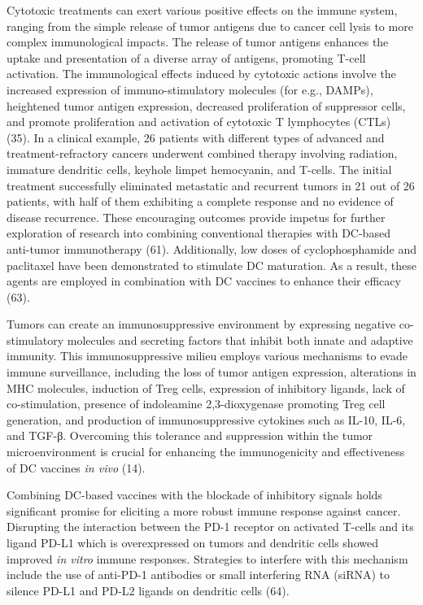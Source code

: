 \documentclass[
]{article}
\begin{document}
Cytotoxic treatments can exert various positive effects on the immune
system, ranging from the simple release of tumor antigens due to cancer
cell lysis to more complex immunological impacts. The release of tumor
antigens enhances the uptake and presentation of a diverse array of
antigens, promoting T-cell activation. The immunological effects induced
by cytotoxic actions involve the increased expression of
immuno-stimulatory molecules (for e.g., DAMPs), heightened tumor antigen
expression, decreased proliferation of suppressor cells, and promote
proliferation and activation of cytotoxic T lymphocytes (CTLs) (35). In
a clinical example, 26 patients with different types of advanced and
treatment-refractory cancers underwent combined therapy involving
radiation, immature dendritic cells, keyhole limpet hemocyanin, and
T-cells. The initial treatment successfully eliminated metastatic and
recurrent tumors in 21 out of 26 patients, with half of them exhibiting
a complete response and no evidence of disease recurrence. These
encouraging outcomes provide impetus for further exploration of research
into combining conventional therapies with DC-based anti-tumor
immunotherapy (61). Additionally, low doses of cyclophosphamide and
paclitaxel have been demonstrated to stimulate DC maturation. As a
result, these agents are employed in combination with DC vaccines to
enhance their efficacy (63).

Tumors can create an immunosuppressive environment by expressing
negative co-stimulatory molecules and secreting factors that inhibit
both innate and adaptive immunity. This immunosuppressive milieu employs
various mechanisms to evade immune surveillance, including the loss of
tumor antigen expression, alterations in MHC molecules, induction of
Treg cells, expression of inhibitory ligands, lack of co-stimulation,
presence of indoleamine 2,3-dioxygenase promoting Treg cell generation,
and production of immunosuppressive cytokines such as IL-10, IL-6, and
TGF-β. Overcoming this tolerance and suppression within the tumor
microenvironment is crucial for enhancing the immunogenicity and
effectiveness of DC vaccines \emph{in vivo} (14).

Combining DC-based vaccines with the blockade of inhibitory signals
holds significant promise for eliciting a more robust immune response
against cancer. Disrupting the interaction between the PD-1 receptor on
activated T-cells and its ligand PD-L1 which is overexpressed on tumors
and dendritic cells showed improved \emph{in vitro} immune responses.
Strategies to interfere with this mechanism include the use of anti-PD-1
antibodies or small interfering RNA (siRNA) to silence PD-L1 and PD-L2
ligands on dendritic cells (64).
\end{document}
